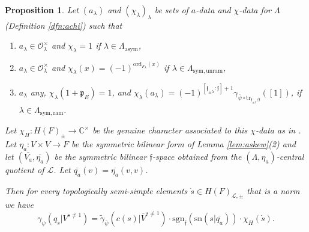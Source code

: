 \documentclass{article}
\def\mf#1{\mathfrak{#1}}
\def\mc#1{\mathcal{#1}}
\def\C{\mathbb{C}}
\def\ol#1{\overline{#1}}
\def\cO{\mathcal{O}}
\newtheorem{pro}[thm]{Proposition}
\theoremstyle{definition}
\numberwithin{equation}{subsection}
\renewcommand{\-}{\hyp{}}
\newcommand{\rf}{\mathfrak{f}}
\begin{document}
\begin{pro} \label{pro:orangebox}
	 Let $(a_\lambda)$ and $(\chi_\lambda)_\lambda$ be sets of $a$-data and $\chi$-data for $\Lambda$ (Definition \ref{dfn:achi}) such that
	\begin{enumerate}
		\item $a_\lambda \in \cO_\lambda^\times$ and $\chi_\lambda=1$ if $\lambda \in \Lambda_\mathrm{asym}$,
		\item $a_\lambda \in \cO_\lambda^\times$ and $\chi_\lambda(x)=(-1)^{\mathrm{ord}_{F_\lambda}(x)}$ if $\lambda \in \Lambda_\mathrm{sym,unram}$,
		\item $a_\lambda$ any, $\chi_\lambda(1+\mf{p}_E)=1$, and $\chi_\lambda(a_\lambda)=(-1)^{[\rf_{\pm\lambda}:\rf]+1}\gamma_{\bar\psi\circ \mathrm{tr}_{\rf_{\pm\lambda}/\rf}}([1])$, if $\lambda \in \Lambda_\mathrm{sym,ram}$.
	\end{enumerate}
	Let $\chi_H : H(F)_\pm \to \C^\times$ be the genuine character associated to this $\chi$-data as in \cite[\S3.2]{KalDC}. Let $\eta_a : V \times V \to F$ be the symmetric bilinear form of Lemma \ref{lem:askew}(2) and let $(\ol{V_a},\ol{\eta_a})$ be the symmetric bilinear $\rf$-space obtained from the $(\Lambda,\eta_a)$-central quotient of $\mc{L}$. Let $\ol{q_a}(v)=\ol{\eta_a}(v,v)$.
	
	Then for every topologically semi-simple elements $\dot s \in H(F)_{\mc{L},\pm}$ that is a norm we have
	\begin{equation}\label{eqn:orangebox} \gamma_\psi(q_{\dot s}|V^{s \neq 1}) = \tilde\gamma_{\bar\psi}(c(s)|\ol{V}^{s \neq 1}) \cdot \mathrm{sgn}_\rf(\mathrm{sn}(s|\ol{q_a})) \cdot \chi_H(\dot s). 
		\end{equation}
\end{pro}
\end{document}
